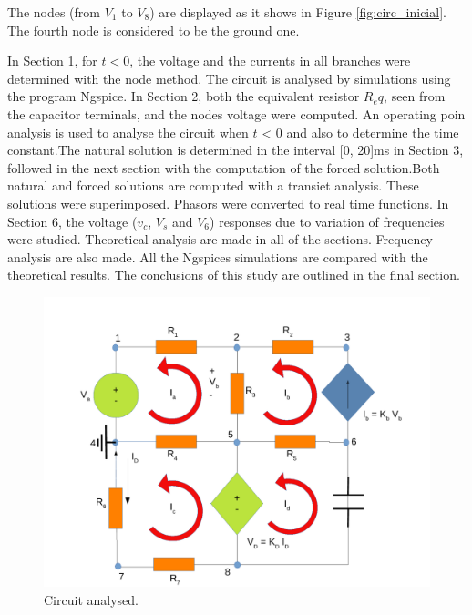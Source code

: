 \par The nodes (from $V_1$ to $V_8$) are displayed as it shows in Figure \ref{fig:circ_inicial}. The fourth node is considered to be the ground one.


\par 
   

\par 
In Section 1, for $t < 0$, the voltage and the currents in all branches were determined with the node method. The circuit is analysed by simulations using the program Ngspice. In Section 2, both the equivalent resistor $R_eq$, seen from the capacitor terminals, and the nodes voltage were computed. An operating poin analysis is used to analyse the circuit when $t$ < $0$ and also to determine the time constant.The natural solution is determined in the interval [0, 20]ms in Section 3, followed in the next section with the computation of the forced solution.Both natural and forced solutions are computed with a transiet analysis. These solutions were superimposed. Phasors were converted to real time functions. In Section 6, the voltage ($v_c$, $V_s$ and $V_6$) responses due to variation of frequencies were studied. Theoretical analysis are made in all of the sections. Frequency analysis are also made. All the Ngspices simulations are compared with the theoretical results.
The conclusions of this study are outlined in the final section.



\begin{figure}[ht] \centering
\includegraphics[width=0.9\linewidth]{t2draw.pdf}
\caption{Circuit analysed.}
\label{RC Circuit.}
\end{figure}

















